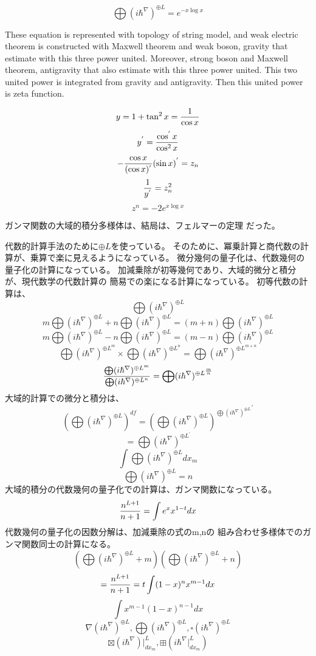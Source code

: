 \documentclass{jsarticle}
\begin{document}
	   $$ \bigoplus{(i \hbar^{\nabla})}^{\oplus L} = e^{-x \log x} $$

	   These equation is represented with topology of string model,
	   and weak electric theorem is constructed with Maxwell theorem 
	   and weak boson, gravity that estimate with this three power united.
	   Moreover, strong boson and Maxwell theorem, antigravity that
	   also estimate with this three power united.
	   This two united power is integrated from gravity and antigravity.
	   Then this united power is zeta function.

	   $$ y =  1 + \tan^2 x = {1 \over {\cos x}} $$
	   $$ y^{'} = {{\cos^{'}x} \over {\cos^2 x}} $$
           $$ -{{\cos x} \over (\cos x)^{'}}(\sin x)^{'} = z_n $$
	   $$ {1 \over y^{'}} = z^2_n$$
           $$ z^n = - 2 e^{x \log x} $$

	   ガンマ関数の大域的積分多様体は、結局は、フェルマーの定理
	   だった。

         代数的計算手法のために$ \oplus L $を使っている。
そのために、冪乗計算と商代数の計算が、乗算で楽に見えるようになっている。
            微分幾何の量子化は、代数幾何の量子化の計算になっている。
  加減乗除が初等幾何であり、大域的微分と積分が、現代数学の代数計算の
  簡易での楽になる計算になっている。
  初等代数の計算は、
  $$ \bigoplus({i \hbar^{\nabla}})^{\oplus L} $$
   $$m \bigoplus({i \hbar^{\nabla}})^{\oplus L} +  
   n\bigoplus({i \hbar^{\nabla}})^{\oplus L} = 
   (m+n) \bigoplus({i \hbar^{\nabla}})^{\oplus L}   $$
   $$ m\bigoplus({i \hbar^{\nabla}})^{\oplus L} -  
   n\bigoplus({i \hbar^{\nabla}})^{\oplus L} = 
   (m-n) \bigoplus({i \hbar^{\nabla}})^{\oplus L}   $$
   $$ \bigoplus({i \hbar^{\nabla}})^{{\oplus L}^m} \times 
      \bigoplus({i \hbar^{\nabla}})^{{\oplus L}^n} =
   \bigoplus({i \hbar^{\nabla}})^{\oplus L^{m+n}} $$
  $$ {{\bigoplus({i \hbar^{\nabla}})^{\oplus L^m}}  \over  
  {\bigoplus({i \hbar^{\nabla}})^{\oplus L^n}}} =  
  \bigoplus({i \hbar^{\nabla}})^{\oplus L^{m\over n}} $$
  大域的計算での微分と積分は、
  $$ \left(\bigoplus({i \hbar^{\nabla}})^{\oplus L}\right)^{df}
  =  {\left(\bigoplus({i \hbar^{\nabla}})^{\oplus L}\right)^{
	  \bigoplus({i \hbar^{\nabla}})^{\oplus L}}}^{'}  $$
  $$ = \bigoplus({i \hbar^{\nabla}})^{\oplus L^{'}} $$
   $$ \int \bigoplus({i \hbar^{\nabla}})^{\oplus L} dx_m $$
   $$ \bigoplus({i \hbar^{\nabla}})^{\oplus L} = n $$
   大域的積分の代数幾何の量子化での計算は、ガンマ関数になっている。
   $$ {n^{L+1} \over {n+1}} = \int e^x x^{1 - t} dx $$
   代数幾何の量子化の因数分解は、加減乗除の式のm,nの
   組み合わせ多様体でのガンマ関数同士の計算になる。
   $$ \left(\bigoplus({i \hbar^{\nabla}})^{\oplus L}+m\right) 
   \left(\bigoplus({i \hbar^{\nabla}})^{\oplus L}+n\right) $$
  $$ = {n^{L+1} \over {n+1}} = t \int (1 - x)^n x^{m - 1} dx $$
  $$ \int x^{m-1}(1 - x)^{n-1} dx $$
  $$ \nabla ({i \hbar^{\nabla}})^{\oplus L}, \bigoplus ({i \hbar^{\nabla}})^{
	   \oplus L}, \square ({i \hbar^{\nabla}})^{\oplus L} $$
   $$ \boxtimes (i \hbar^{\nabla})|_{dx_m}^L, \boxplus (i \hbar^{\nabla}|_
   {dx_m}^L) $$
\end{document}
